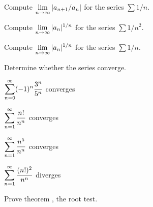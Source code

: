 \exercise Compute $\displaystyle\lim_{n\to\infty} |a_{n+1}/a_n|$ for the series
$\sum 1/n$.
\endexercise

\exercise Compute $\displaystyle\lim_{n\to\infty} |a_n|^{1/n}$ for the series
$\sum 1/n^2$.
\endexercise

\exercise Compute $\displaystyle\lim_{n\to\infty} |a_n|^{1/n}$ for the series
$\sum 1/n$.

\msk\noindent Determine whether the series converge.
\twocol
\endexercise

\exercise $\displaystyle\sum_{n=0}^\infty (-1)^{n}{3^n\over 5^n}$
\answer converges
\endanswer
\endexercise

\exercise $\displaystyle\sum_{n=1}^\infty {n!\over n^n}$
\answer converges
\endanswer
\endexercise

\exercise $\displaystyle\sum_{n=1}^\infty {n^5\over n^n}$
\answer converges
\endanswer
\endexercise

\exercise $\displaystyle\sum_{n=1}^\infty {(n!)^2\over n^n}$
\answer diverges
\endanswer

\endtwocol

\ssk
\endexercise

\exercise Prove theorem , the root test.
\endexercise

\endexercises

